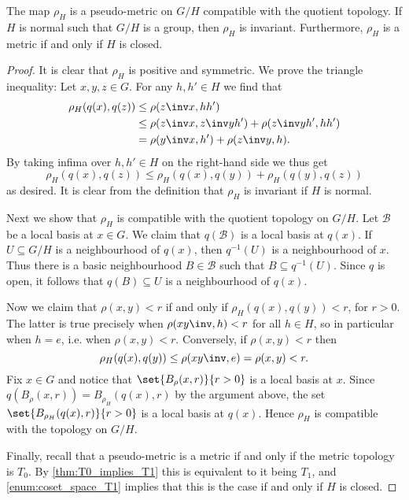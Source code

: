 \documentclass[article, a4paper, 11pt, oneside]{memoir}
\numberwithin{equation}{chapter}
\newcommand{\preim}{^{-1}}
\begin{document}
\begin{proposition}
    \label{thm:coset-space-metric}
    The map $\rho_H$ is a pseudo-metric on $G/H$ compatible with the quotient topology. If $H$ is normal such that $G/H$ is a group, then $\rho_H$ is invariant. Furthermore, $\rho_H$ is a metric if and only if $H$ is closed.
\end{proposition}

\newcommand{\calB}{\mathcal{B}}

\begin{proof}
    It is clear that $\rho_H$ is positive and symmetric. We prove the triangle inequality: Let $x,y,z \in G$. For any $h, h' \in H$ we find that
    \begin{align*}
        \rho_H(q(x), q(z))
            &\leq \rho(z\inv x, hh') \\
            &\leq \rho(z\inv x, z\inv yh') + \rho(z\inv yh', hh') \\
            &= \rho(y\inv x, h') + \rho(z\inv y, h).
    \end{align*}
    By taking infima over $h,h' \in H$ on the right-hand side we thus get
    \begin{equation*}
        \rho_H(q(x),q(z))
            \leq \rho_H(q(x),q(y)) + \rho_H(q(y),q(z))
    \end{equation*}
    as desired. It is clear from the definition that $\rho_H$ is invariant if $H$ is normal.

    Next we show that $\rho_H$ is compatible with the quotient topology on $G/H$. Let $\calB$ be a local basis at $x \in G$. We claim that $q(\calB)$ is a local basis at $q(x)$. If $U \subseteq G/H$ is a neighbourhood of $q(x)$, then $q\preim(U)$ is a neighbourhood of $x$. Thus there is a basic neighbourhood $B \in \calB$ such that $B \subseteq q\preim(U)$. Since $q$ is open, it follows that $q(B) \subseteq U$ is a neighbourhood of $q(x)$.

    Now we claim that $\rho(x,y) < r$ if and only if $\rho_H(q(x),q(y)) < r$, for $r > 0$. The latter is true precisely when $\rho(xy\inv, h) < r$ for all $h \in H$, so in particular when $h = e$, i.e. when $\rho(x,y) < r$. Conversely, if $\rho(x,y) < r$ then
    \begin{equation*}
        \rho_H(q(x),q(y))
            \leq \rho(xy\inv, e)
            = \rho(x,y)
            < r.
    \end{equation*}
    Fix $x \in G$ and notice that $\set{B_\rho(x,r)}{r > 0}$ is a local basis at $x$. Since $q(B_\rho(x,r)) = B_{\rho_H}(q(x),r)$ by the argument above, the set $\set{B_{\rho_H}(q(x),r)}{r > 0}$ is a local basis at $q(x)$. Hence $\rho_H$ is compatible with the topology on $G/H$.

    Finally, recall that a pseudo-metric is a metric if and only if the metric topology is $T_0$. By \cref{thm:T0_implies_T1} this is equivalent to it being $T_1$, and \cref{enum:coset_space_T1} implies that this is the case if and only if $H$ is closed.
\end{proof}
\end{document}
